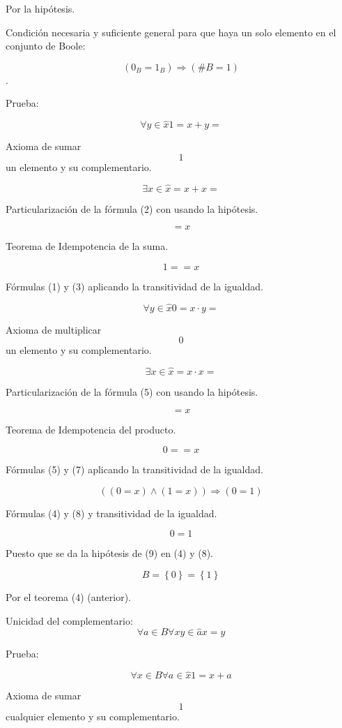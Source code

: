 Por la hipótesis.

Condición necesaria y suficiente general para que haya un solo elemento
en el conjunto de Boole:

\[\left( {0_{B} = 1_{B}} \right)\Rightarrow\left( {\text{\#}{B = 1}} \right)\].

Prueba:

\[\forall{y \in \widehat{x}}{{1 = {x + y}} =}\]

Axioma de sumar \[1\] un elemento y su complementario.

\[\exists{x \in \widehat{x}}{}{{= {x + x}} =}\]

Particularización de la fórmula (2) con usando la hipótesis.

\[= x\]

Teorema de Idempotencia de la suma.

\[{1 =} = x\]

Fórmulas (1) y (3) aplicando la transitividad de la igualdad.

\[\forall{y \in \widehat{x}}{{0 = {x \cdot y}} =}\]

Axioma de multiplicar \[0\] un elemento y su complementario.

\[\exists{x \in \widehat{x}}{}{{= {x \cdot x}} =}\]

Particularización de la fórmula (5) con usando la hipótesis.

\[{= x}{}\]

Teorema de Idempotencia del producto.

\[{0 =} = x\]

Fórmulas (5) y (7) aplicando la transitividad de la igualdad.

\[\left( {{({0 = x})} \land {({1 = x})}} \right)\Rightarrow{({0 = 1})}\]

Fórmulas (4) y (8) y transitividad de la igualdad.

\[0 = 1\]

Puesto que se da la hipótesis de (9) en (4) y (8).

\[{B = \left\{ 0 \right\}} = \left\{ 1 \right\}\]

Por el teorema (4) (anterior).

Unicidad del
complementario:\[{\forall{a \in B}\forall{\mathit{xy} \in \widehat{a}}}{}{}{}{x = y}\]

Prueba:

\[\forall{x \in B}\forall{a \in \widehat{x}}{1 = {x + a}}\]

Axioma de sumar \[1\] cualquier elemento y su complementario.

